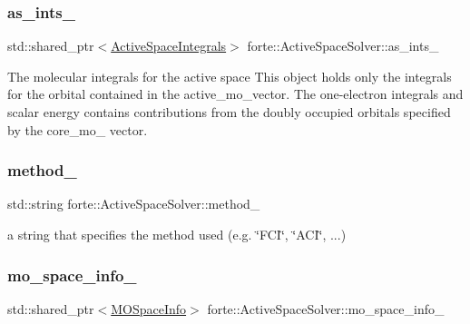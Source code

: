 \subsubsection{\texorpdfstring{as\+\_\+ints\+\_\+}{as\_ints\_}}
{\footnotesize\ttfamily std\+::shared\+\_\+ptr$<$\mbox{\hyperlink{classforte_1_1_active_space_integrals}{Active\+Space\+Integrals}}$>$ forte\+::\+Active\+Space\+Solver\+::as\+\_\+ints\+\_\+\hspace{0.3cm}{\ttfamily [protected]}}

The molecular integrals for the active space This object holds only the integrals for the orbital contained in the active\+\_\+mo\+\_\+vector. The one-\/electron integrals and scalar energy contains contributions from the doubly occupied orbitals specified by the core\+\_\+mo\+\_\+ vector. \mbox{\label{classforte_1_1_active_space_solver_a7d69532c3bb03e0dc39a0b5b8c633544}} 
\subsubsection{\texorpdfstring{method\+\_\+}{method\_}}
{\footnotesize\ttfamily std\+::string forte\+::\+Active\+Space\+Solver\+::method\+\_\+\hspace{0.3cm}{\ttfamily [protected]}}



a string that specifies the method used (e.\+g. \char`\"{}\+F\+C\+I\char`\"{}, \char`\"{}\+A\+C\+I\char`\"{}, ...) 

\mbox{\label{classforte_1_1_active_space_solver_a32a700889f190e3114786cee58255f27}} 
\subsubsection{\texorpdfstring{mo\+\_\+space\+\_\+info\+\_\+}{mo\_space\_info\_}}
{\footnotesize\ttfamily std\+::shared\+\_\+ptr$<$\mbox{\hyperlink{classforte_1_1_m_o_space_info}{M\+O\+Space\+Info}}$>$ forte\+::\+Active\+Space\+Solver\+::mo\+\_\+space\+\_\+info\+\_\+\hspace{0.3cm}{\ttfamily [protected]}}




